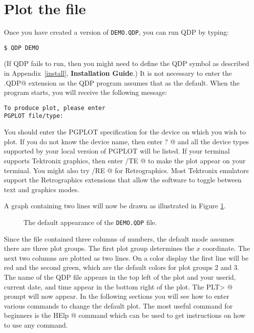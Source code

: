 \section{Plot the file}

Once you have created a version of {\tt DEMO.QDP}, you can run QDP by
typing:
\begin{verbatim}
$ QDP DEMO
\end{verbatim}
(If QDP fails to run, then you might need to define the QDP symbol
as described in Appendix~\ref{install}, {\bf Installation Guide}.)
It is not necessary to enter the \verb@.QDP@ extension as the QDP
program assumes that as the default.
When the program starts,
you will receive the following message:
\begin{verbatim}
To produce plot, please enter
PGPLOT file/type:
\end{verbatim}
You should enter the PGPLOT specification
for the device on which you wish to plot.
If you do not know the device name,
then enter \verb@ ? @ and all the device types
supported by your local version of PGPLOT will be listed.
If your terminal supports Tektronix graphics, then enter \verb@ /TE @
to make the plot appear on your terminal.
You might also try \verb@ /RE @ for Retrographics.
Most Tektronix emulators support the Retrographics extensions
that allow the software to toggle between text and graphics modes.

A graph containing two lines will now be drawn as illustrated in
Figure \ref{fig21}.
\begin{figure}
   \vspace{11cm}
   \caption{The default appearance of the {\tt DEMO.QDP} file.}
   \label{fig21}
\end{figure}
Since the file contained three columns of numbers,
the default mode assumes there are three plot groups.
The first plot group determines the $x$ coordinate.
The next two columns are plotted as two lines.
On a color display the first line will be red and the second green,
which are the default colors for plot groups 2 and 3.
The name of the QDP file appears in the top left of the plot
and your userid, current date, and time
appear in the bottom right of the plot.
The \verb@ PLT> @ prompt will now appear.
In the following sections
you will see how to enter various commands to change the default plot.
The most useful command for beginners is the \verb@ HElp @ command
which can be used to get instructions on how to use any command.

